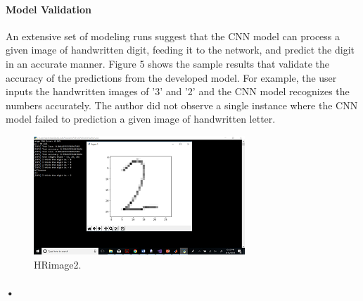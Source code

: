 \documentclass{article}
\begin{document}
\paragraph{Model Validation}
An extensive set of modeling runs suggest that the CNN model can process a given image of handwritten digit, feeding it to the network, and predict the digit in an accurate manner. Figure 5 shows the sample results that validate the accuracy of the predictions from the developed model. For example, the user inputs the handwritten images of '3' and '2' and the CNN model recognizes the numbers accurately. The author did not observe a single instance where the CNN model failed to prediction a given image of handwritten letter.



\begin{figure}
  \includegraphics[width=\linewidth]{HRimg2.png}
  \caption{HRimage2.}
  \label{fig:HRimage2}
\end{figure}


\paragraph{•}
\end{document}
